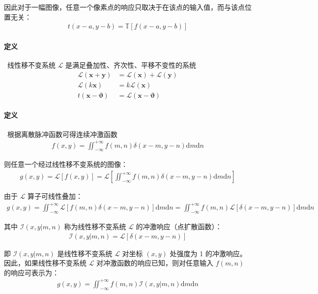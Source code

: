 \documentclass{article}
\renewcommand{\d}{\mathrm{d}}
\begin{document}
因此对于一幅图像，任意一个像素点的响应只取决于在该点的输入值，而与该点位置无关：
\begin{align*}
    t(x-a,y-b)=\mathbb{T}\left[f(x-a,y-b)\right]
\end{align*}

\paragraph*{定义}~{线性移不变系统 $\mathcal{L}$ 是满足叠加性、齐次性、平移不变性的系统}
\begin{align*}
    \mathcal{L}(\bm{x}+\bm{y})&=\mathcal{L}(\bm{x})+\mathcal{L}(\bm{y})
    \\
    \mathcal{L}(k\bm{x})&=k\mathcal{L}(\bm{x})
    \\
    t(\bm{x}-\bm{\vartheta})&=\mathcal{L}(\bm{x}-\bm{\vartheta})
\end{align*}

\paragraph*{定义}~{根据离散脉冲函数可得连续冲激函数}
\begin{align*}
    f(x,y)=\mathop{\iint}_{-\infty}^{+\infty}f(m,n)\delta(x-m,y-n)\d m\d n
\end{align*}

则任意一个经过线性移不变系统的图像：
\begin{align*}
    g(x,y)=\mathcal{L}\left[f(x,y)\right]=\mathcal{L}\left[\mathop{\iint}_{-\infty}^{+\infty}f(m,n)\delta(x-m,y-n)\d m\d n\right]
\end{align*}

由于 $\mathcal{L}$ 算子可线性叠加：
\begin{align*}
    g(x,y)=\mathop{\iint}_{-\infty}^{+\infty}\mathcal{L}\left[f(m,n)\delta(x-m,y-n)\right]\d m\d n=\mathop{\iint}_{-\infty}^{+\infty}f(m,n)\mathcal{L}\left[\delta(x-m,y-n)\right]\d m\d n
\end{align*}

其中 $\mathcal{I}(x,y|m,n)$ 称为线性移不变系统 $\mathcal{L}$ 的冲激响应（点扩散函数）：
\begin{align*}
    \mathcal{I}(x,y|m,n)=\mathcal{L}\left[\delta(x-m,y-n)\right]
\end{align*}

即 $\mathcal{I}(x,y|m,n)$ 是线性移不变系统 $\mathcal{L}$ 对坐标 $(x,y)$ 处强度为 1 的冲激响应。因此，如果线性移不变系统 $\mathcal{L}$ 对冲激函数的响应已知，则对任意输入 $f(m,n)$ 的响应可表示为：
\begin{align*}
    g(x,y)=\mathop{\iint}_{-\infty}^{+\infty}f(m,n)\mathcal{I}(x,y|m,n)\d m\d n
\end{align*}
\end{document}
